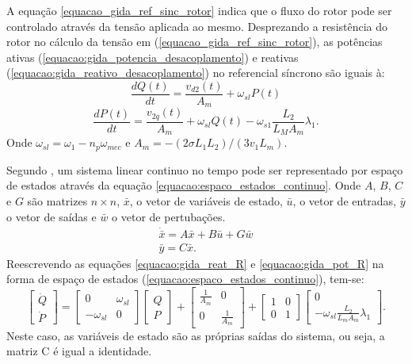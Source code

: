 	A equação \ref{equacao_gida_ref_sinc_rotor} indica que o fluxo do rotor pode ser controlado através da tensão aplicada ao mesmo. Desprezando a resistência do rotor no cálculo da tensão em (\ref{equacao_gida_ref_sinc_rotor}), as potências ativas (\ref{equacao:gida_potencia_desacoplamento}) e reativas (\ref{equacao:gida_reativo_desacoplamento}) no referencial síncrono são iguais à:
	\begin{equation}
		\label{equacao:gida_reat_R}
		\frac{dQ(t)}{dt}=\frac{v_{d2}(t)}{A_m}+\omega_{sl}P(t)		
	\end{equation}
	\begin{equation}
		\label{equacao:gida_pot_R}
		\frac{dP(t)}{dt}=\frac{v_{2q}(t)}{A_m}+\omega_{sl}Q(t)-\omega_{s1}\frac{L_2}{L_MA_m}\lambda_1.
	\end{equation}
	Onde $\omega_{sl}=\omega_1-n_p\omega_{mec}$ e $A_m=-(2\sigma L_1L_2)/(3v_1L_m)$.
	
	Segundo , um sistema linear continuo no tempo pode ser representado por espaço de estados através da equação \ref{equacao:espaco_estados_continuo}. Onde $A$, $B$, $C$ e $G$ são matrizes $n \times n$, $\bar{x}$, o vetor de variáveis de estado, $\bar{u}$, o vetor de entradas, $\bar{y}$ o vetor de saídas e $\bar{w}$ o vetor de pertubações.
	\begin{equation}
		\label{equacao:espaco_estados_continuo}
		\begin{split}
			\dot{\bar{x}}=A\bar{x}+B\bar{u}+G\bar{w} \\
			\bar{y}=C\bar{x}.
		\end{split}
	\end{equation}
	Reescrevendo as equações \ref{equacao:gida_reat_R} e \ref{equacao:gida_pot_R} na forma de espaço de estados (\ref{equacao:espaco_estados_continuo}), tem-se:
	\begin{equation}
		\label{equacao:espaco_estados_gida}
		\begin{bmatrix}
			\dot{Q} \\ \dot{P}
		\end{bmatrix} =
		\begin{bmatrix}
			0            & \omega_{sl} \\
			-\omega_{sl} & 0
		\end{bmatrix}
		\begin{bmatrix}
			Q \\
			P
		\end{bmatrix} + 
		\begin{bmatrix}
			\frac{1}{A_m} & 0 \\
			0 & \frac{1}{A_m}
		\end{bmatrix} + 
		\begin{bmatrix}
			1 & 0 \\
			0 & 1
		\end{bmatrix}
		\begin{bmatrix}
			0 \\
			-\omega_{sl}\frac{L_2}{L_mA_m}\lambda_1
		\end{bmatrix}.
	\end{equation}
	Neste caso, as variáveis de estado são as próprias saídas do sistema, ou seja, a matriz C é igual a identidade.
	
